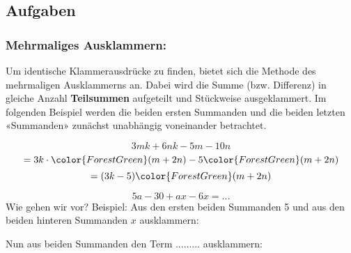 

\subsection*{Aufgaben}





\newpage



\subsubsection{Mehrmaliges Ausklammern:}
 Um identische Klammerausdrücke zu finden, bietet sich die Methode des mehrmaligen Ausklammerns an.
 Dabei wird die Summe (bzw. Differenz) in gleiche Anzahl \textbf{Teilsummen} aufgeteilt und Stückweise ausgeklammert.
 Im folgenden Beispiel werden die beiden ersten Summanden und die beiden letzten «Summanden» zunächst unabhängig voneinander betrachtet.

$$3mk+6nk-5m-10n $$
$$= 3k\cdot{}{\color{ForestGreen}(m+2n)}-5{\color{ForestGreen}(m+2n)} $$
$$= (3k-5){\color{ForestGreen}(m+2n)}$$


\begin{beispiel}{}{}
  $$5a-30+ax-6x = ...$$
  Wie gehen wir vor? Beispiel: Aus den ersten beiden Summanden 5 und
  aus den beiden hinteren Summanden $x$ ausklammern:


  Nun aus beiden Summanden den Term ......... 
  ausklammern:

\end{beispiel}


